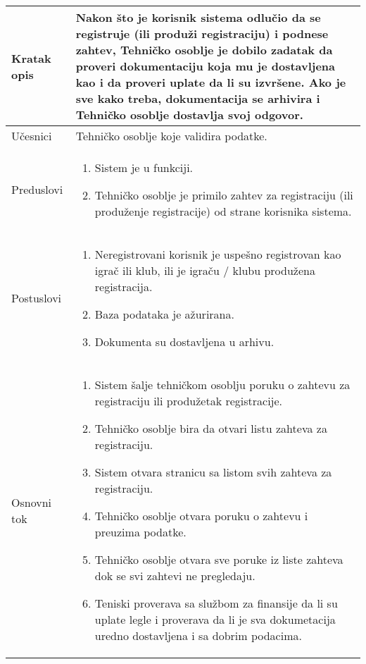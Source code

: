 \documentclass{article}
\begin{document}
       \begin{longtable}{| p{} | p{} |} 
            \hline
                Kratak opis & Nakon što je korisnik sistema odlučio da se registruje (ili produži registraciju) i podnese zahtev, Tehničko osoblje je dobilo zadatak da proveri dokumentaciju koja mu je dostavljena kao i da proveri uplate da li su izvršene. Ako je sve kako treba, dokumentacija se arhivira i Tehničko osoblje dostavlja svoj odgovor.\\ 
            \hline    
                Učesnici & Tehničko osoblje koje validira podatke. \\
            \hline
               Preduslovi & \begin{enumerate}
                   \item Sistem je u funkciji.
                   \item Tehničko osoblje je primilo zahtev za registraciju (ili produženje registracije) od strane korisnika sistema.
               \end{enumerate}\\
            \hline  
                Postuslovi & \begin{enumerate}
                    \item Neregistrovani korisnik je uspešno registrovan kao igrač ili klub, ili je igraču / klubu produžena registracija.
                    \item Baza podataka je ažurirana.
                    \item Dokumenta su dostavljena u arhivu.
                \end{enumerate}\\
            \hline
                Osnovni tok & 
                \begin{enumerate}
                    \item Sistem šalje tehničkom osoblju poruku o zahtevu za registraciju ili produžetak registracije.
                    \item Tehničko osoblje bira da otvari listu zahteva za registraciju.
                    \item Sistem otvara stranicu sa listom svih zahteva za registraciju.
                    \item Tehničko osoblje otvara poruku o zahtevu i preuzima podatke. 
                    \item Tehničko osoblje otvara sve poruke iz liste zahteva dok se svi zahtevi ne pregledaju.
                    \item Teniski proverava sa službom za finansije da li su uplate legle i proverava da li je sva dokumetacija uredno dostavljena i sa dobrim podacima.

\end{enumerate}
\end{longtable}
\end{document}
